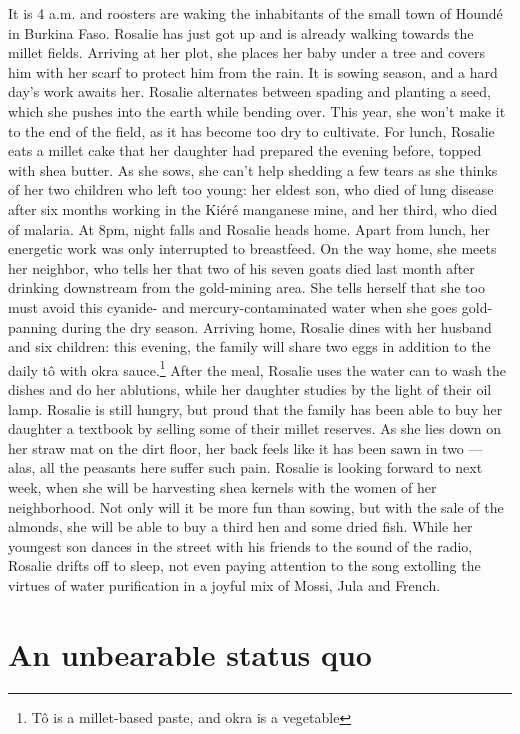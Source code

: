 \documentclass[a5paper,english,openany]{memoir}
\begin{document}
It is 4 a.m. and roosters are waking the inhabitants of the small town of Houndé in Burkina Faso. Rosalie has just got up and is already walking towards the millet fields. Arriving at her plot, she places her baby under a tree and covers him with her scarf to protect him from the rain. It is sowing season, and a hard day's work awaits her. Rosalie alternates between spading and planting a seed, which she pushes into the earth while bending over. This year, she won't make it to the end of the field, as it has become too dry to cultivate. For lunch, Rosalie eats a millet cake that her daughter had prepared the evening before, topped with shea butter. As she sows, she can't help shedding a few tears as she thinks of her two children who left too young: her eldest son, who died of lung disease after six months working in the Kiéré manganese mine, and her third, who died of malaria. At 8pm, night falls and Rosalie heads home. Apart from lunch, her energetic work was only interrupted to breastfeed. On the way home, she meets her neighbor, who tells her that two of his seven goats died last month after drinking downstream from the gold-mining area. She tells herself that she too must avoid this cyanide- and mercury-contaminated water when she goes gold-panning during the dry season. Arriving home, Rosalie dines with her husband and six children: this evening, the family will share %
two eggs in addition to the daily tô with okra sauce.\footnote{Tô is a millet-based paste, and okra is a vegetable} %
After the meal, Rosalie uses the water can to wash the dishes and do her ablutions, while her daughter studies by the light of their oil lamp. Rosalie is still hungry, but proud that the family has been able to buy her daughter a textbook by selling some of their millet reserves. As she lies down on her straw mat on the dirt floor, her back feels like it has been sawn in two --- alas, all the peasants here suffer such pain. Rosalie is looking forward to next week, when she will be harvesting shea kernels with the women of her neighborhood. Not only will it be more fun than sowing, but with the sale of the almonds, she will be able to buy a third hen and some dried fish. While her youngest son dances in the street with his friends to the sound of the radio, Rosalie drifts off to sleep, not even paying attention to the song extolling the virtues of water purification in a joyful mix of Mossi, Jula and French. 

\chapter{An unbearable status quo\label{ch:statu_quo}}
\end{document}
